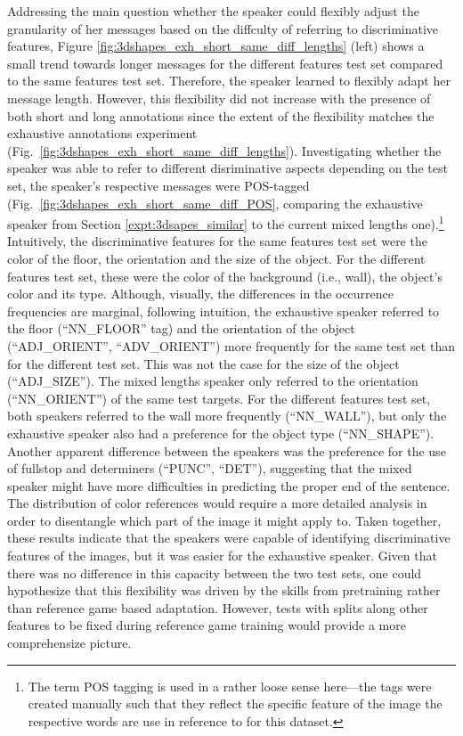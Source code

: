 Addressing the main question whether the speaker could flexibly adjust the granularity of her messages based on the diffculty of referring to discriminative features, Figure \ref{fig:3dshapes_exh_short_same_diff_lengths} (left) shows a small trend towards longer messages for the different features test set compared to the same features test set. Therefore, the speaker learned to flexibly adapt her message length. However, this flexibility did not increase with the presence of both short and long annotations since the extent of the flexibility matches the exhaustive annotations experiment (Fig.~\ref{fig:3dshapes_exh_short_same_diff_lengths}). 
Investigating whether the speaker was able to refer to different disriminative aspects depending on the test set, the speaker's respective messages were POS-tagged (Fig.~\ref{fig:3dshapes_exh_short_same_diff_POS}, comparing the exhaustive speaker from Section \ref{expt:3dsapes_similar} to the current mixed lengths one).\footnote{The term POS tagging is used in a rather loose sense here---the tags were created manually such that they reflect the specific feature of the image the respective words are use in reference to for this dataset.} Intuitively, the discriminative features for the same features test set were the color of the floor, the orientation and the size of the object. For the different features test set, these were the color of the background (i.e., wall), the object's color and its type. Although, visually, the differences in the occurrence frequencies are marginal, following intuition, the exhaustive speaker referred to the floor (``NN\_FLOOR'' tag) and the orientation of the object (``ADJ\_ORIENT'', ``ADV\_ORIENT'') more frequently for the same test set than for the different test set. This was not the case for the size of the object (``ADJ\_SIZE''). The mixed lengths speaker only referred to the orientation (``NN\_ORIENT'') of the same test targets. For the different features test set, both speakers referred to the wall more frequently (``NN\_WALL''), but only the exhaustive speaker also had a preference for the object type (``NN\_SHAPE''). Another apparent difference between the speakers was the preference for the use of fullstop and determiners (``PUNC'', ``DET''), suggesting that the mixed speaker might have more difficulties in predicting the proper end of the sentence.
The distribution of color references would require a more detailed analysis in order to disentangle which part of the image it might apply to. Taken together, these results indicate that the speakers were capable of identifying discriminative features of the images, but it was easier for the exhaustive speaker. Given that there was no difference in this capacity between the two test sets, one could hypothesize that this flexibility was driven by the skills from pretraining rather than reference game based adaptation. However, tests with splits along other features to be fixed during reference game training would provide a more comprehensize picture.

